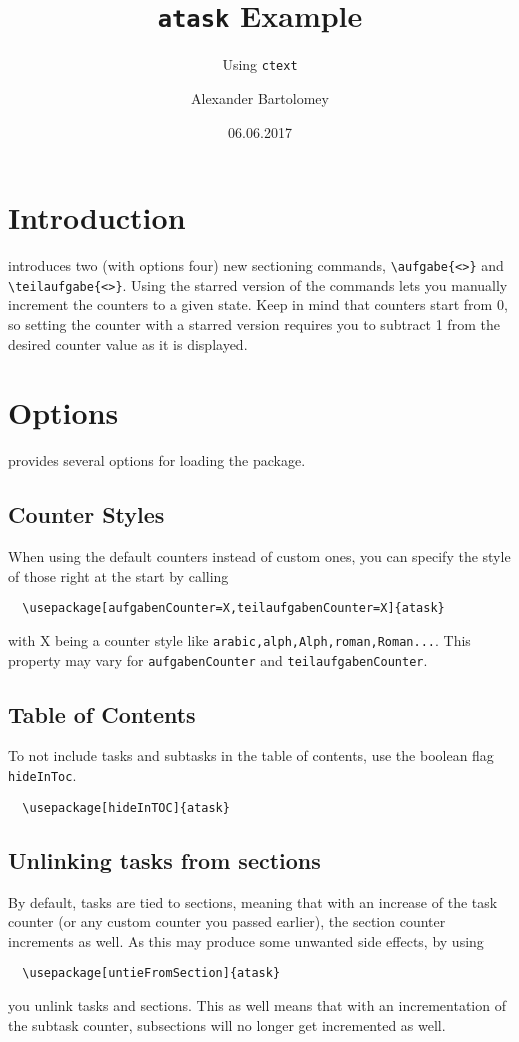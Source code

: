 \documentclass{ctext}
\title{\texttt{atask} Example}
\subtitle{Using \texttt{ctext}}
\author{Alexander Bartolomey}
\date{06.06.2017}
\begin{document}
\maketitle
\tableofcontents*

\section{Introduction}
\atask introduces two (with options four) new sectioning commands, \verb|\aufgabe{<>}| and \\ \verb|\teilaufgabe{<>}|. Using the starred version of the commands lets you manually increment the counters to a given state. Keep in mind that counters start from 0, so setting the counter with a starred version requires you to subtract 1 from the desired counter value as it is displayed.
\section{Options}
\atask provides several options for loading the package.
\subsection{Counter Styles}
When using the default counters instead of custom ones, you can specify the style of those right at the start by calling
\begin{verbatim}
  \usepackage[aufgabenCounter=X,teilaufgabenCounter=X]{atask}
\end{verbatim}
with X being a counter style like \texttt{arabic,alph,Alph,roman,Roman...}. This property may vary for \texttt{aufgabenCounter} and \texttt{teilaufgabenCounter}.
\subsection{Table of Contents}
To not include tasks and subtasks in the table of contents, use the boolean flag \texttt{hideInToc}.
\begin{verbatim}
  \usepackage[hideInTOC]{atask}
\end{verbatim}
\subsection{Unlinking tasks from sections}
By default, tasks are tied to sections, meaning that with an increase of the task counter (or any custom counter you passed earlier), the section counter increments as well. As this may produce some unwanted side effects, by using
\begin{verbatim}
  \usepackage[untieFromSection]{atask}
\end{verbatim}
you unlink tasks and sections. This as well means that with an incrementation of the subtask counter, subsections will no longer get incremented as well.
\end{document}
